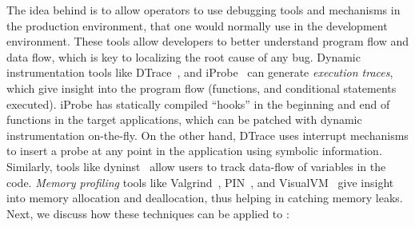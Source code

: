 The idea behind \parikshan is to allow operators to use debugging tools and mechanisms in the production environment, that one would normally use in the development environment.
These tools allow developers to better understand program flow and data flow, which is key to localizing the root cause of any bug.
Dynamic instrumentation tools like DTrace~\cite{dtrace}, and iProbe~\cite{iProbe} can generate \emph{execution traces}, which give insight into the program flow (functions, and conditional statements executed).
iProbe has statically compiled ``hooks'' in the beginning and end of functions in the target applications, which can be patched with dynamic instrumentation on-the-fly.
On the other hand, DTrace uses interrupt mechanisms to insert a probe at any point in the application using symbolic information. 
Similarly, tools like dyninst~\cite{dyninst} allow users to track data-flow of variables in the code.
\emph{Memory profiling} tools like Valgrind~\cite{valgrind}, PIN~\cite{pin}, and VisualVM~\cite{visualvm} give insight into memory allocation and deallocation, thus helping in catching memory leaks.
Next, we discuss how these techniques can be applied to \parikshan:


